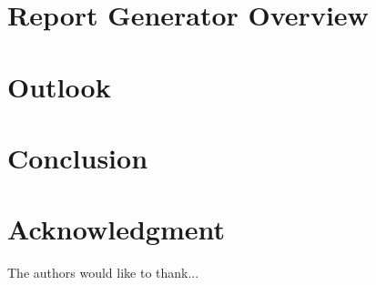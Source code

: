 \documentclass[journal]{IEEEtran}
\begin{document}




\section{Report Generator Overview}



\section{Outlook}




\section{Conclusion}






\section*{Acknowledgment}

The authors would like to thank...





\printbibliography
\end{document}
